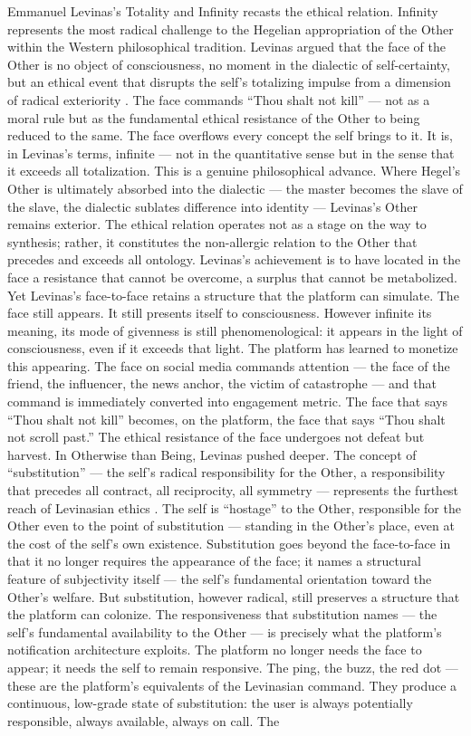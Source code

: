 Emmanuel Levinas's Totality and Infinity recasts the ethical relation. Infinity represents the most radical challenge to the Hegelian appropriation of the Other within the Western philosophical tradition. Levinas argued that the face of the Other is no object of consciousness, no moment in the dialectic of self-certainty, but an ethical event that disrupts the self’s totalizing impulse from a dimension of radical exteriority \cite[pp.~194-- 219]{levinas_1961}. The face commands “Thou shalt not kill” — not as a moral rule but as the fundamental ethical resistance of the Other to being reduced to the same. The face overflows every concept the self brings to it. It is, in Levinas’s terms, infinite — not in the quantitative sense but in the sense that it exceeds all totalization. This is a genuine philosophical advance. Where Hegel’s Other is ultimately absorbed into the dialectic — the master becomes the slave of the slave, the dialectic sublates difference into identity — Levinas’s Other remains exterior. The ethical relation operates not as a stage on the way to synthesis; rather, it constitutes the non-allergic relation to the Other that precedes and exceeds all ontology. Levinas’s achievement is to have located in the face a resistance that cannot be overcome, a surplus that cannot be metabolized. Yet Levinas’s face-to-face retains a structure that the platform can simulate. The face still appears. It still presents itself to consciousness. However infinite its meaning, its mode of givenness is still phenomenological: it appears in the light of consciousness, even if it exceeds that light. The platform has learned to monetize this appearing. The face on social media commands attention — the face of the friend, the influencer, the news anchor, the victim of catastrophe — and that command is immediately converted into engagement metric. The face that says “Thou shalt not kill” becomes, on the platform, the face that says “Thou shalt not scroll past.” The ethical resistance of the face undergoes not defeat but harvest. In Otherwise than Being, Levinas pushed deeper. The concept of “substitution” — the self’s radical responsibility for the Other, a responsibility that precedes all contract, all reciprocity, all symmetry — represents the furthest reach of Levinasian ethics \cite[pp.~111-- 134]{levinas_1974}. The self is “hostage” to the Other, responsible for the Other even to the point of substitution — standing in the Other’s place, even at the cost of the self’s own existence. Substitution goes beyond the face-to-face in that it no longer requires the appearance of the face; it names a structural feature of subjectivity itself — the self’s fundamental orientation toward the Other’s welfare. But substitution, however radical, still preserves a structure that the platform can colonize. The responsiveness that substitution names — the self’s fundamental availability to the Other — is precisely what the platform’s notification architecture exploits. The platform no longer needs the face to appear; it needs the self to remain responsive. The ping, the buzz, the red dot — these are the platform’s equivalents of the Levinasian command. They produce a continuous, low-grade state of substitution: the user is always potentially responsible, always available, always on call. The 